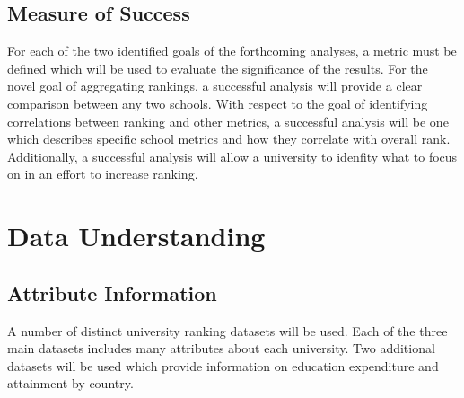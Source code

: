 \documentclass[12pt]{article}
\begin{document}
\subsection{Measure of Success}
For each of the two identified goals of the forthcoming analyses, a metric must be defined which will be used to evaluate the significance of the results. For the novel goal of aggregating rankings, a successful analysis will provide a clear comparison between any two schools. With respect to the goal of identifying correlations between ranking and other metrics, a successful analysis will be one which describes specific school metrics and how they correlate with overall rank. Additionally, a successful analysis will allow a university to idenfity what to focus on in an effort to increase ranking.

\section{Data Understanding}

\subsection{Attribute Information}
A number of distinct university ranking datasets will be used. Each of the three main datasets includes many attributes about each university.
Two additional datasets will be used which provide information on education expenditure and attainment by country.
\end{document}
